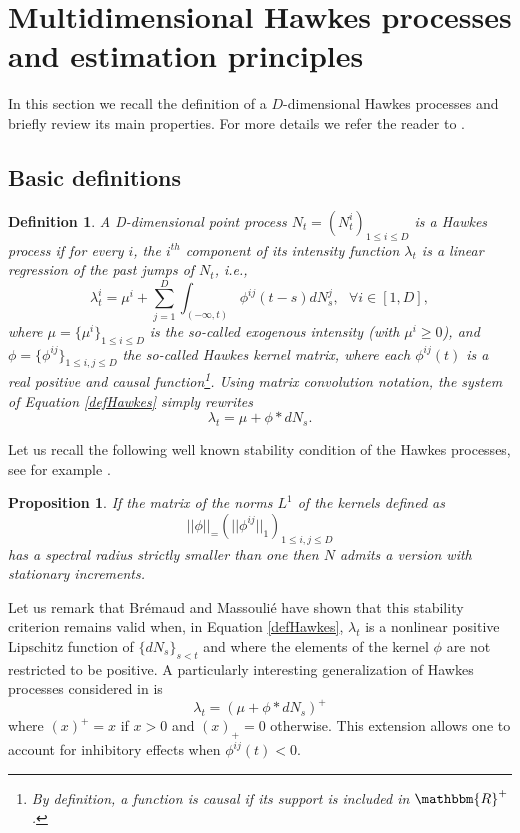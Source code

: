 \documentclass[a4paper,11pt]{article}
\newtheorem{definition}{Definition}[section]
\newtheorem{proposition}{Proposition}[section]
\begin{document}
\section{Multidimensional Hawkes processes and estimation principles}
\label{s1}
In this section we recall the definition of a $D$-dimensional Hawkes processes
and briefly review its main properties. For more details we refer
the reader to \cite{bacry2014second}.

\subsection{Basic definitions}

\begin{definition}
A D-dimensional point process $N_t=(N^i_t)_{1\leq i\leq D}$ is a Hawkes process if for every $i$, the
$i^{th}$ component of its
intensity function $\lambda_t$ is a linear regression of the past jumps of $N_t$, i.e.,
\begin{equation}
\label{defHawkes}
\lambda^i_t=\mu^i+\sum_{j=1}^D\int_{(-\infty,t)} \phi^{ij}(t-s)dN_s^j, ~~~\forall i \in [1,D],
\end{equation}
where $\mu=\{\mu^i\}_{1\leq i\leq D}$ is the so-called
{\em exogenous intensity} (with $\mu^i \geq 0$), and
$\phi=\{\phi^{ij}\}_{1\leq i,j\leq D}$ the so-called {\em Hawkes kernel} matrix, where
each $\phi^{ij}(t)$ is a real positive and causal function\footnote{By definition, a function is causal if its support is included in $\mathbbm{R}^+$.}.
Using matrix convolution notation, the system of Equation \eqref{defHawkes} simply rewrites
\begin{equation}
\label{defHawkes1}
\lambda_t=\mu+\phi \ast dN_s.
\end{equation}
\end{definition}

\noindent Let us recall the following well known stability condition of the Hawkes processes, see for example \cite{hawkes1971spectra}.
\begin{proposition}
\label{prop1}
If the matrix of the norms $L^1$ of the kernels defined as $$||\phi||_=(||\phi^{ij}||_1)_{1\leq i,j\leq D}$$ has a spectral radius strictly smaller than one then $N$ admits a version with stationary increments.
\end{proposition}


\noindent Let us remark that Br\'emaud and Massouli\'e \cite{bremaud1996stability} have shown that this stability
criterion remains valid when, in Equation \eqref{defHawkes}, $\lambda_t$ is a nonlinear positive Lipschitz function of $\{dN_s\}_{s<t}$ and where the elements of the kernel $\phi$ are not restricted to be positive. A particularly interesting generalization of Hawkes processes considered in \cite{hansen2012lasso} is
\begin{equation}
\label{defHawkes2}
\lambda_t= \left(\mu+\phi\ast dN_s \right)^+
\end{equation}
where $(x)^+ = x$ if $x>0$ and $(x)_+ = 0$ otherwise.
This extension allows one to account for inhibitory effects when $\phi^{ij}(t) < 0$.\\
\end{document}
